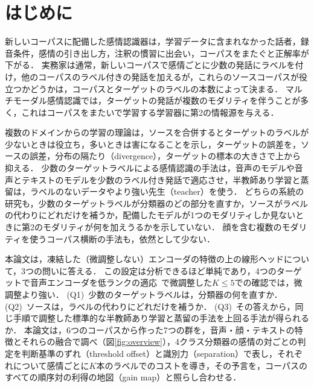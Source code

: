 \section{はじめに}
\label{sec:introduction}

新しいコーパスに配備した感情認識器は，学習データに含まれなかった話者，録音条件，感情の引き出し方，注釈の慣習に出会い，コーパスをまたぐと正解率が下がる\cite{schuller2010crosscorpus,gideon2021addog,feng2023fewshot}．
実務家は通常，新しいコーパスで感情ごとに少数の発話にラベルを付け，他のコーパスのラベル付きの発話を加えるが，これらのソースコーパスが役立つかどうかは，コーパスとターゲットのラベルの本数によって決まる．
マルチモーダル感情認識では，ターゲットの発話が複数のモダリティを伴うことが多く，これはコーパスをまたいで学習する学習器に第2の情報源を与える．

複数のドメインからの学習の理論は，ソースを合併するとターゲットのラベルが少ないときは役立ち，多いときは害になることを示し，ターゲットの誤差を，ソースの誤差，分布の隔たり（divergence），ターゲットの標本の大きさで上から抑える\cite{bendavid2010theory,blitzer2007learning,desilva2023value}．
少数のターゲットラベルによる感情認識の手法は，音声のモデルや音声とテキストのモデルを少数のラベル付き発話で適応させ\cite{feng2023fewshot,he2025m4ser,zaidi2024enhancing}，半教師あり学習と蒸留は，ラベルのないデータやより強い先生（teacher）を使う\cite{lee2013pseudolabel,hinton2015distilling,lopezpaz2016unifying}．
どちらの系統の研究も，少数のターゲットラベルが分類器のどの部分を直すか，ソースがラベルの代わりにどれだけを補うか，配備したモデルが1つのモダリティしか見ないときに第2のモダリティが何を加えうるかを示していない．
顔を含む複数のモダリティを使うコーパス横断の手法も，依然として少ない\cite{ahn2025multitask}．

本論文は，凍結した（微調整しない）エンコーダの特徴の上の線形ヘッドについて，3つの問いに答える．
この設定は分析できるほど単純であり，4つのターゲットで音声エンコーダを低ランクの適応~\cite{hu2022lora}で微調整した$K \le 5$での確認では，微調整より強い．
(Q1)~少数のターゲットラベルは，分類器の何を直すか．
(Q2)~ソースは，ラベルの代わりにどれだけを補うか．
(Q3)~その答えから，同じ手順で調整した標準的な半教師あり学習と蒸留の手法を上回る手法が得られるか．
本論文は，6つのコーパスから作った7つの群を，音声・顔・テキストの特徴とそれらの融合で調べ（図\ref{fig:overview}），4クラス分類器の感情の対ごとの判定を判断基準のずれ（threshold offset）と識別力（separation）で表し，それぞれについて感情ごとに$K$本のラベルでのコストを導き，その予言を，コーパスのすべての順序対の利得の地図（gain map）と照らし合わせる．

